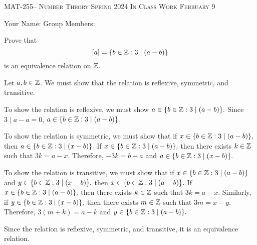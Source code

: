 \documentclass[handout]{ximera}
\date{February 9, 2024}
\begin{document}
\handoutAbstract
\maketitle
  \begin{center}%
    {\large \scshape MAT-255-- Number Theory \hfill Spring 2024 \hfill In Class Work February 9}%
    
    {\large
        Your Name: \hrulefill \quad Group Members:\hrulefill \quad \hrulefill
	\par}%
  \end{center}%


\begin{br}
  Prove that \[[a]=\{b\in\mathbb Z: 3\mid(a-b)\}\] is an equivalence relation on $\mathbb Z.$

    \begin{solution}
        Let $a,b\in\mathbb Z$. We must show that the relation is reflexive, symmetric, and transitive.
  
        To show the relation is reflexive, we must show $a\in \{b\in\mathbb Z: 3\mid(a-b)\}.$ Since $3\mid a-a=0$, $a\in \{b\in\mathbb Z: 3\mid(a-b)\}.$
  
        To show the relation is symmetric, we must show that if $x\in \{b\in\mathbb Z: 3\mid(a-b)\},$ then $a\in \{b\in\mathbb Z: 3\mid(x-b)\}.$ If $x\in \{b\in\mathbb Z: 3\mid(a-b)\},$ then there exists $k\in\mathbb Z$ such that $3k=a-x.$ Therefore, $-3k=b-a$ and $a\in \{b\in\mathbb Z: 3\mid(x-b)\}.$
  
        To show the relation is transitive, we must show that if $x\in \{b\in\mathbb Z: 3\mid(a-b)\}$ and $y\in \{b\in\mathbb Z: 3\mid(x-b)\},$ then $x\in \{b\in\mathbb Z: 3\mid(a-b)\}.$ If $x\in \{b\in\mathbb Z: 3\mid(a-b)\},$ then there exists $k\in\mathbb Z$ such that $3k=a-x.$ 
        Similarly, if $y\in \{b\in\mathbb Z: 3\mid(x-b)\},$ then there exists $m\in\mathbb Z$ such that $3m=x-y.$ Therefore, $3(m+k)=a-k$ and $y\in \{b\in\mathbb Z: 3\mid(a-b)\}.$
        
        Since the relation is reflexive, symmetric, and transitive, it is an equivalence relation.
  \end{solution}
\end{br}


  
\end{document}
